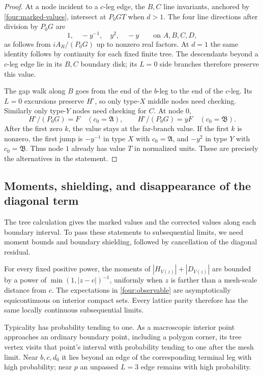 \begin{proof}
At a node incident to a $c$-leg edge, the $B,C$ line invariants,
anchored by \eqref{four:marked-values}, intersect at $P_0GT$ when $d>1$.
The four line directions after division by $P_0G$ are
\begin{equation}
 1,\quad -y^{-1},\quad y^2,\quad -y
 \qquad\text{on }A,B,C,D,
 \label{four:directions}
\end{equation}
as follows from $iA_R/(P_0G)$ up to nonzero real factors.  At $d=1$
the same identity follows by continuity for each fixed finite tree.
The descendants beyond a $c$-leg edge lie in its $B,C$ boundary disk;
its $L=0$ side branches therefore preserve this value.

The gap walk along $B$ goes from the end of the $b$-leg to the end
of the $c$-leg.  Its $L=0$ excursions preserve $H^\circ$, so only
type-$X$ middle nodes need checking.  Similarly only type-$Y$ nodes
need checking for $C$.  At node $0$,
\begin{equation}
 H^\circ/(P_0G)=F\quad(c_0=\mathfrak A),\qquad
 H^\circ/(P_0G)=yF\quad(c_0=\mathfrak B).
 \label{four:corrected-branch}
\end{equation}
After the first zero $k$, the value stays at the far-branch value.
If the first $k$ is nonzero, the first jump is $-y^{-1}$ in type $X$
with $c_0=\mathfrak A$, and $-y^2$ in type $Y$ with
$c_0=\mathfrak B$.  Thus node $1$ already has value $T$ in normalized
units.  These are precisely the alternatives in the statement.
\end{proof}

\subsection{Moments, shielding, and disappearance of the diagonal term}

The tree calculation gives the marked values and the corrected values
along each boundary interval.  To pass these statements to subsequential
limits, we need moment bounds and boundary shielding, followed by
cancellation of the diagonal residual.

\begin{lemma}
\label{four:compactness}
For every fixed positive power, the moments of $|H_{V(z)}|+|D_{V(z)}|$
are bounded by a power of $\min(1,|z-c|)^{-1}$, uniformly when $z$
is farther than a mesh-scale distance from $c$.  The expectations in
\eqref{four:observable} are asymptotically equicontinuous on interior
compact sets.  Every lattice parity therefore has the same locally
continuous subsequential limits.

Typicality has probability tending to one.  As a macroscopic interior
point approaches an ordinary boundary point, including a polygon corner,
its tree vertex visits that point's interval with probability tending to
one after the mesh limit.  Near $b,c,d_0$ it lies beyond an edge of the
corresponding terminal leg with high probability; near $p$ an unpassed
$L=3$ edge remains with high probability.
\end{lemma}

